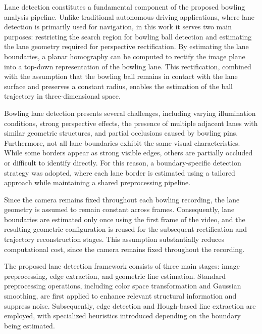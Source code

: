 Lane detection constitutes a fundamental component of the proposed bowling analysis pipeline. Unlike traditional autonomous driving applications, where lane detection is primarily used for navigation, in this work it serves two main purposes: restricting the search region for bowling ball detection and estimating the lane geometry required for perspective rectification. By estimating the lane boundaries, a planar homography can be computed to rectify the image plane into a top-down representation of the bowling lane. This rectification, combined with the assumption that the bowling ball remains in contact with the lane surface and preserves a constant radius, enables the estimation of the ball trajectory in three-dimensional space.

Bowling lane detection presents several challenges, including varying illumination conditions, strong perspective effects, the presence of multiple adjacent lanes with similar geometric structures, and partial occlusions caused by bowling pins. Furthermore, not all lane boundaries exhibit the same visual characteristics. While some borders appear as strong visible edges, others are partially occluded or difficult to identify directly. For this reason, a boundary-specific detection strategy was adopted, where each lane border is estimated using a tailored approach while maintaining a shared preprocessing pipeline.

Since the camera remains fixed throughout each bowling recording, the lane geometry is assumed to remain constant across frames. Consequently, lane boundaries are estimated only once using the first frame of the video, and the resulting geometric configuration is reused for the subsequent rectification and trajectory reconstruction stages. This assumption substantially reduces computational cost, since the camera remains fixed throughout the recording.

The proposed lane detection framework consists of three main stages: image preprocessing, edge extraction, and geometric line estimation. Standard preprocessing operations, including color space transformation and Gaussian smoothing, are first applied to enhance relevant structural information and suppress noise. Subsequently, edge detection and Hough-based line extraction are employed, with specialized heuristics introduced depending on the boundary being estimated.





